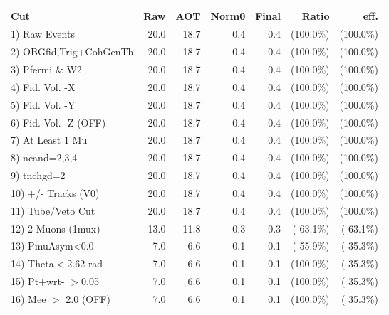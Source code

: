  \begin{table}[h!]\centering
 \begin{tabular}{||l||r|r|r|r|r|r||}
 \hline
 \hline
 Cut & Raw & AOT & Norm0 & Final & Ratio & eff.       \\
 \hline
  1) Raw Events           &         20.0 &         18.7 &          0.4 &          0.4 & (100.0\%) & (100.0\%) \\
  2) OBGfid,Trig+CohGenTh &         20.0 &         18.7 &          0.4 &          0.4 & (100.0\%) & (100.0\%) \\
  3) Pfermi \& W2         &         20.0 &         18.7 &          0.4 &          0.4 & (100.0\%) & (100.0\%) \\
  4) Fid. Vol. -X         &         20.0 &         18.7 &          0.4 &          0.4 & (100.0\%) & (100.0\%) \\
  5) Fid. Vol. -Y         &         20.0 &         18.7 &          0.4 &          0.4 & (100.0\%) & (100.0\%) \\
  6) Fid. Vol. -Z (OFF)   &         20.0 &         18.7 &          0.4 &          0.4 & (100.0\%) & (100.0\%) \\
  7) At Least 1 Mu        &         20.0 &         18.7 &          0.4 &          0.4 & (100.0\%) & (100.0\%) \\
  8) ncand=2,3,4          &         20.0 &         18.7 &          0.4 &          0.4 & (100.0\%) & (100.0\%) \\
  9) tnchgd=2             &         20.0 &         18.7 &          0.4 &          0.4 & (100.0\%) & (100.0\%) \\
 10) +/- Tracks (V0)      &         20.0 &         18.7 &          0.4 &          0.4 & (100.0\%) & (100.0\%) \\
 11) Tube/Veto Cut        &         20.0 &         18.7 &          0.4 &          0.4 & (100.0\%) & (100.0\%) \\
 12) 2 Muons (1mux)       &         13.0 &         11.8 &          0.3 &          0.3 & ( 63.1\%) & ( 63.1\%) \\
 13) PmuAsym<0.0          &          7.0 &          6.6 &          0.1 &          0.1 & ( 55.9\%) & ( 35.3\%) \\
 14) Theta$<$2.62 rad     &          7.0 &          6.6 &          0.1 &          0.1 & (100.0\%) & ( 35.3\%) \\
 15) Pt+wrt- $>$0.05      &          7.0 &          6.6 &          0.1 &          0.1 & (100.0\%) & ( 35.3\%) \\
 16) Mee $>$ 2.0  (OFF)   &          7.0 &          6.6 &          0.1 &          0.1 & (100.0\%) & ( 35.3\%) \\

\end{tabular}
\end{table}
